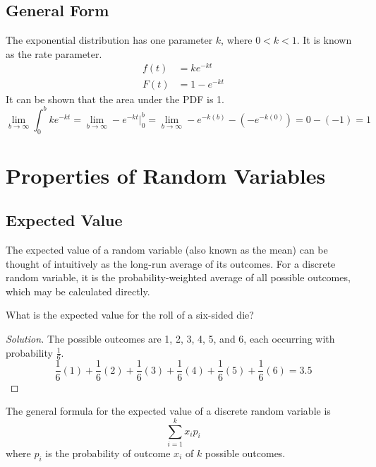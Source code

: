 \documentclass[11pt,leqno,letterpaper]{article}
\begin{document}
\subsection{General Form}
The exponential distribution has one parameter $k$,
where $0<k<1$. It is known as the rate parameter.
\begin{align*}
\tag{PDF}
f(t) &= ke^{-kt} \\
\tag{CDF}
F(t) &= 1-e^{-kt}
\end{align*}
It can be shown that the area under the PDF is 1.
\[
\lim_{b\to \infty} \int_0^b ke^{-kt} =
\lim_{b\to \infty} -e^{-kt}\bigg|_0^b =
\lim_{b\to \infty} -e^{-k(b)} - \left(-e^{-k(0)}\right) =
0 - (-1) = 1
\]
\section{Properties of Random Variables}
\subsection{Expected Value}
The expected value of a random variable (also known as the mean)
can be thought of intuitively as the long-run average of its outcomes.
For a discrete random variable, it is the probability-weighted
average of all possible outcomes, which may be calculated directly.
\begin{mdframed}
\begin{problem}
What is the expected value for the roll of a six-sided die?
\begin{proof}[Solution]
The possible outcomes are 1, 2, 3, 4, 5, and 6, each occurring
with probability $\frac{1}{6}$.
\[
\frac{1}{6}(1)+ \frac{1}{6}(2)+ \frac{1}{6}(3)+
\frac{1}{6}(4)+ \frac{1}{6}(5)+ \frac{1}{6}(6) = 3.5
\]
\end{proof}
\end{problem}
\end{mdframed}
The general formula for the expected value of a
discrete random variable is
\[
\sum_{i=1}^k x_i p_i
\]
where $p_i$ is the probability of outcome $x_i$
of $k$ possible outcomes.
\end{document}
